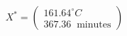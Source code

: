 

\[
X^{*} = \left( \begin{array}{c} 161.64^{\circ}C \\ 367.36 \;\; \mbox{minutes} \end{array} \right)
\]


